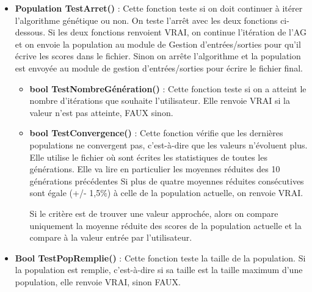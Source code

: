 \documentclass[a4paper,11pt]{article}
\begin{document}
				\begin{itemize}
							\item \textbf{Population TestArret()} :  Cette fonction teste si on doit continuer à itérer l’algorithme génétique ou non. 
								On teste l’arrêt avec les deux fonctions ci-dessous. 
								Si les deux fonctions renvoient VRAI, on continue l’itération de l’AG et on envoie la population au module de Gestion d’entrées/sorties pour qu’il écrive les scores dans le fichier. 
								Sinon on arrête l'algorithme et la population est envoyée au module de gestion d’entrées/sorties pour écrire le fichier final.\vspace{0.2cm}
								\begin{itemize}
								\item \textbf{bool TestNombreGénération()} : Cette fonction teste si on a atteint le nombre d’itérations que souhaite l’utilisateur.
									Elle renvoie VRAI si la valeur n’est pas atteinte, FAUX sinon.\vspace{0.2cm}

								\item \textbf{bool TestConvergence()} : Cette fonction vérifie que les dernières populations ne convergent pas, c'est-à-dire que les valeurs n'évoluent plus. %
								Elle utilise le fichier où sont écrites les statistiques de toutes les générations. Elle va lire en particulier les moyennes réduites des 10 générations précédentes
															Si plus de quatre moyennes réduites consécutives sont égale (+/- 1,5$\%$) à celle de la population actuelle, on renvoie VRAI.

															Si le critère est de trouver une valeur approchée, alors on compare uniquement la moyenne réduite des scores de la population actuelle et la compare à la valeur entrée par l'utilisateur.\vspace{0.2cm}

								\end{itemize}
							
							\item \textbf{Bool TestPopRemplie()} : Cette fonction teste la taille de la population. Si la population est remplie, c’est-à-dire si sa taille est la taille maximum d’une population, elle renvoie VRAI, sinon FAUX.\vspace{0.2cm}
					
					\end{itemize}
				
\end{document}
